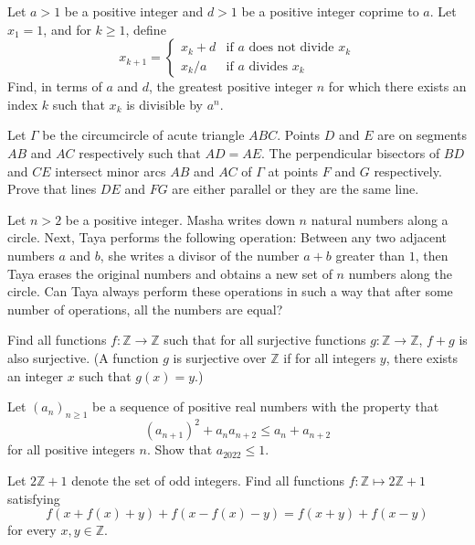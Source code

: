 \documentclass[11pt]{scrartcl}
\begin{document}
\begin{problem}[3159161448000677570]
Let $a > 1$ be a positive integer and $d > 1$ be a positive integer coprime to $a$. Let $x_1=1$, and for $k\geq 1$, define
$$x_{k+1} = \begin{cases}
x_k + d &\text{if } a \text{ does not divide } x_k \\
x_k/a & \text{if } a \text{ divides } x_k
\end{cases}$$Find, in terms of $a$ and $d$, the greatest positive integer $n$ for which there exists an index $k$ such that $x_k$ is divisible by $a^n$.
\end{problem}
\begin{problem}[625002281186392279]
	Let $\Gamma$ be the circumcircle of acute triangle $ABC$. Points $D$ and $E$ are on segments $AB$ and $AC$ respectively such that $AD = AE$. The perpendicular bisectors of $BD$ and $CE$ intersect minor arcs $AB$ and $AC$ of $\Gamma$ at points $F$ and $G$ respectively. Prove that lines $DE$ and $FG$ are either parallel or they are the same line.
\end{problem}
\begin{problem}[989812634983805]
Let $n>2$ be a positive integer. Masha writes down $n$ natural numbers along a circle. Next, Taya performs the following operation: Between any two adjacent numbers $a$ and $b$, she writes a divisor of the number $a+b$ greater than $1$, then Taya erases the original numbers and obtains a new set of $n$ numbers along the circle. Can Taya always perform these operations in such a way that after some number of operations, all the numbers are equal?
\end{problem}
\begin{problem}[205642765475865]
Find all functions $f:\mathbb Z\to \mathbb Z$ such that for all surjective functions $g:\mathbb Z\to \mathbb Z$, $f+g$ is also surjective. (A function $g$ is surjective over $\mathbb Z$ if for all integers $y$, there exists an integer $x$ such that $g(x)=y$.)
\end{problem}
\begin{problem}[633974672407561]
Let $(a_n)_{n\geq 1}$ be a sequence of positive real numbers with the property that
$$(a_{n+1})^2 + a_na_{n+2} \leq a_n + a_{n+2}$$for all positive integers $n$. Show that $a_{2022}\leq 1$.
\end{problem}
\begin{problem}[307861271235140]
Let $2\mathbb{Z} + 1$ denote the set of odd integers. Find all functions $f:\mathbb{Z} \mapsto 2\mathbb{Z} + 1$ satisfying\[ f(x + f(x) + y) + f(x - f(x) - y) = f(x+y) + f(x-y) \]for every $x, y \in \mathbb{Z}$.
\end{problem}
\end{document}
